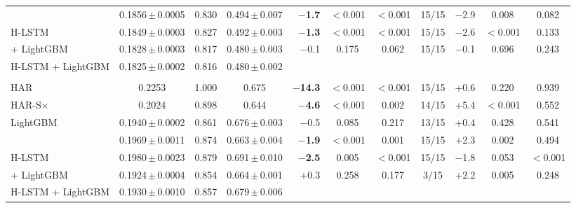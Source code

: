 \begin{tabular}{@{}lcccrcccrcc@{}}
\HQ{} & 0.1856\,$\pm$\,0.0005 & 0.830 & 0.494\,$\pm$\,0.007 & \textbf{$-$1.7} & $<$0.001 & $<$0.001 & 15/15 & $-$2.9 & 0.008 & 0.082 \\
H-LSTM & 0.1849\,$\pm$\,0.0003 & 0.827 & 0.492\,$\pm$\,0.003 & \textbf{$-$1.3} & $<$0.001 & $<$0.001 & 15/15 & $-$2.6 & $<$0.001 & 0.133 \\
\HQ{} + LightGBM & 0.1828\,$\pm$\,0.0003 & 0.817 & 0.480\,$\pm$\,0.003 & $-$0.1 & 0.175 & 0.062 & 15/15 & $-$0.1 & 0.696 & 0.243 \\
H-LSTM + LightGBM & 0.1825\,$\pm$\,0.0002 & 0.816 & 0.480\,$\pm$\,0.002 &  &  &  &  &  &  &  \\
\addlinespace[2pt]
\multicolumn{11}{@{}l}{\emph{Daily bars} (8,100 test forecasts, 5 runs)} \\
HAR & 0.2253 & 1.000 & 0.675 & \textbf{$-$14.3} & $<$0.001 & $<$0.001 & 15/15 & +0.6 & 0.220 & 0.939 \\
HAR-S$\times$ & 0.2024 & 0.898 & 0.644 & \textbf{$-$4.6} & $<$0.001 & 0.002 & 14/15 & +5.4 & $<$0.001 & 0.552 \\
LightGBM & 0.1940\,$\pm$\,0.0002 & 0.861 & 0.676\,$\pm$\,0.003 & $-$0.5 & 0.085 & 0.217 & 13/15 & +0.4 & 0.428 & 0.541 \\
\HQ{} & 0.1969\,$\pm$\,0.0011 & 0.874 & 0.663\,$\pm$\,0.004 & \textbf{$-$1.9} & $<$0.001 & 0.001 & 15/15 & +2.3 & 0.002 & 0.494 \\
H-LSTM & 0.1980\,$\pm$\,0.0023 & 0.879 & 0.691\,$\pm$\,0.010 & \textbf{$-$2.5} & 0.005 & $<$0.001 & 15/15 & $-$1.8 & 0.053 & $<$0.001 \\
\HQ{} + LightGBM & 0.1924\,$\pm$\,0.0004 & 0.854 & 0.664\,$\pm$\,0.001 & +0.3 & 0.258 & 0.177 & 3/15 & +2.2 & 0.005 & 0.248 \\
H-LSTM + LightGBM & 0.1930\,$\pm$\,0.0010 & 0.857 & 0.679\,$\pm$\,0.006 &  &  &  &  &  &  &  \\
\bottomrule
\end{tabular}
